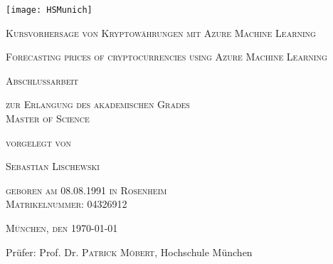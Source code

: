 \begin{titlepage}
	\centering
	\texttt{[image: HSMunich]}\par
	{\scshape\LARGE Kursvorhersage von Kryptowährungen mit Azure Machine Learning \par}
	\vspace{0.3cm}
	{\scshape\large Forecasting prices of cryptocurrencies using Azure Machine Learning \par}
	{\scshape\Large Abschlussarbeit\par}
	\vspace{0.3cm}
	{\scshape\small zur Erlangung des akademischen Grades \\Master of Science\par}
	\vspace{0.2cm}
	{\scshape\small vorgelegt von\par}
	{\scshape\Large Sebastian Lischewski\par}
	\vspace{0.2cm}
	{\scshape\small geboren am 08.08.1991 in Rosenheim\\ Matrikelnummer: 04326912\par}
	\vspace{0.2cm}
	{\scshape\small München, den \today \par}
	\vfill
	Prüfer: Prof. Dr. \textsc{Patrick Möbert}, Hochschule München\par

	\vfill
\end{titlepage}